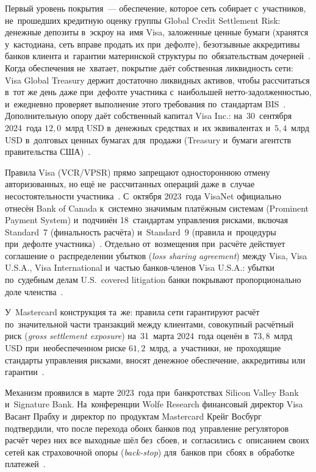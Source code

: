 Первый уровень покрытия~--- обеспечение, которое сеть собирает с~участников,
не~прошедших кредитную оценку группы Global Credit Settlement Risk: денежные
депозиты в~эскроу на~имя Visa, заложенные ценные бумаги (хранятся у~кастодиана,
сеть вправе продать их при~дефолте), безотзывные аккредитивы банков клиента
и~гарантии материнской структуры по~обязательствам
дочерней~\cite{visa-10k-fy2017,visa-10k-settlement-guarantee-fy2023,visa-canada-pps-self-assessment-2025}.
Когда обеспечения не~хватает, покрытие даёт собственная ликвидность сети: Visa
Global Treasury держит достаточно ликвидных активов, чтобы рассчитаться в~тот
же день даже при~дефолте участника с~наибольшей нетто-задолженностью,
и~ежедневно проверяет выполнение этого требования по~стандартам
BIS~\cite{visa-canada-pps-self-assessment-2025}. Дополнительную опору даёт
собственный капитал Visa Inc.: на~30~сентября 2024~года $12{,}0$~млрд USD
в~денежных средствах и~их эквивалентах и~$5{,}4$~млрд USD в~долговых ценных
бумагах для~продажи (Treasury и~бумаги агентств правительства
США)~\cite{visa-canada-pps-self-assessment-2025}.

Правила Visa (VCR/VPSR) прямо запрещают одностороннюю отмену авторизованных, но ещё
не~рассчитанных операций даже в~случае несостоятельности
участника~\cite{visa-canada-pps-self-assessment-2025}. С~октября 2023~года
VisaNet официально отнесён Bank of Canada к~системно значимым платёжным системам
(Prominent Payment System) и~подчинён 18~стандартам управления
рисками, включая Standard~7 (финальность расчёта) и~Standard~9 (правила
и~процедуры при~дефолте участника)~\cite{visa-canada-pps-self-assessment-2025}.
Отдельно от~возмещения при~расчёте действует соглашение
о~распределении убытков (\textit{loss sharing agreement}) между Visa, Visa U.S.A.,
Visa International и~частью банков-членов Visa U.S.A.: убытки по~судебным делам
U.S.~covered litigation банки покрывают пропорционально доле членства~\cite{visa-10k-fy2017}.

У~Mastercard конструкция та~же: правила сети гарантируют расчёт по~значительной
части транзакций между клиентами, совокупный расчётный риск (\textit{gross
settlement exposure}) на~31~марта 2024~года оценён в~$73{,}8$~млрд USD
при~необеспеченном риске $61{,}2$~млрд, а~участники, не~проходящие стандарты
управления рисками, вносят денежное обеспечение, аккредитивы или
гарантии~\cite{mc-10q-settlement-risk-q1-2024}.

Механизм проявился в~марте 2023~года при~банкротствах Silicon Valley Bank
и~Signature Bank. На~конференции Wolfe Research финансовый директор Visa Васант
Прабху и~директор по~продуктам Mastercard Крейг Восбург подтвердили, что после
перехода обоих банков под~управление регуляторов расчёт через них все выходные
шёл без~сбоев, и~согласились с~описанием своих сетей как
страховочной опоры (\textit{back-stop}) для~банков
при~сбоях в~обработке платежей~\cite{paymentsdive-svb-signature-card-networks-2023}.

